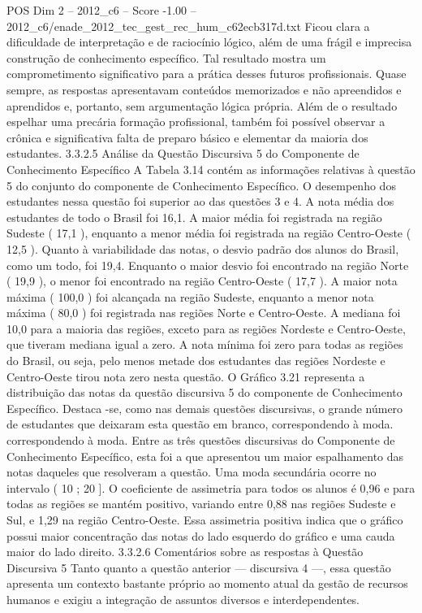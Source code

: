 \begin{textsample}{POS Dim 2 – 2012\_c6 – Score -1.00 – 2012\_c6/enade\_2012\_tec\_gest\_rec\_hum\_c62ecb317d.txt}
Ficou clara a dificuldade de interpretação e de raciocínio lógico, além de uma frágil e imprecisa construção de conhecimento específico.
Tal resultado mostra um comprometimento significativo para a prática desses futuros profissionais.
Quase sempre, as respostas apresentavam conteúdos memorizados e não apreendidos e aprendidos e, portanto, sem argumentação lógica própria.
Além de o resultado espelhar uma precária formação profissional, também foi possível observar a crônica e significativa falta de preparo básico e elementar da maioria dos estudantes. 3.3.2.5 Análise da Questão Discursiva 5 do Componente de Conhecimento Específico A Tabela 3.14 contém as informações relativas à questão 5 do conjunto do componente de Conhecimento Específico.
O desempenho dos estudantes nessa questão foi superior ao das questões 3 e 4.
A nota média dos estudantes de todo o Brasil foi 16,1.
A maior média foi registrada na região Sudeste ( 17,1 ), enquanto a menor média foi registrada na região Centro-Oeste ( 12,5 ).
Quanto à variabilidade das notas, o desvio padrão dos alunos do Brasil, como um todo, foi 19,4.
Enquanto o maior desvio foi encontrado na região Norte ( 19,9 ), o menor foi encontrado na região Centro-Oeste ( 17,7 ).
A maior nota máxima ( 100,0 ) foi alcançada na região Sudeste, enquanto a menor nota máxima ( 80,0 ) foi registrada nas regiões Norte e Centro-Oeste.
A mediana foi 10,0 para a maioria das regiões, exceto para as regiões Nordeste e Centro-Oeste, que tiveram mediana igual a zero.
A nota mínima foi zero para todas as regiões do Brasil, ou seja, pelo menos metade dos estudantes das regiões Nordeste e Centro-Oeste tirou nota zero nesta questão.
O Gráfico 3.21 representa a distribuição das notas da questão discursiva 5 do componente de Conhecimento Específico.
Destaca -se, como nas demais questões discursivas, o grande número de estudantes que deixaram esta questão em branco, correspondendo à moda. correspondendo à moda.
Entre as três questões discursivas do Componente de Conhecimento Específico, esta foi a que apresentou um maior espalhamento das notas daqueles que resolveram a questão.
Uma moda secundária ocorre no intervalo ( 10 ; 20 ].
O coeficiente de assimetria para todos os alunos é 0,96 e para todas as regiões se mantém positivo, variando entre 0,88 nas regiões Sudeste e Sul, e 1,29 na região Centro-Oeste.
Essa assimetria positiva indica que o gráfico possui maior concentração das notas do lado esquerdo do gráfico e uma cauda maior do lado direito. 3.3.2.6 Comentários sobre as respostas à Questão Discursiva 5 Tanto quanto a questão anterior — discursiva 4 —, essa questão apresenta um contexto bastante próprio ao momento atual da gestão de recursos humanos e exigiu a integração de assuntos diversos e interdependentes.

\end{textsample}
